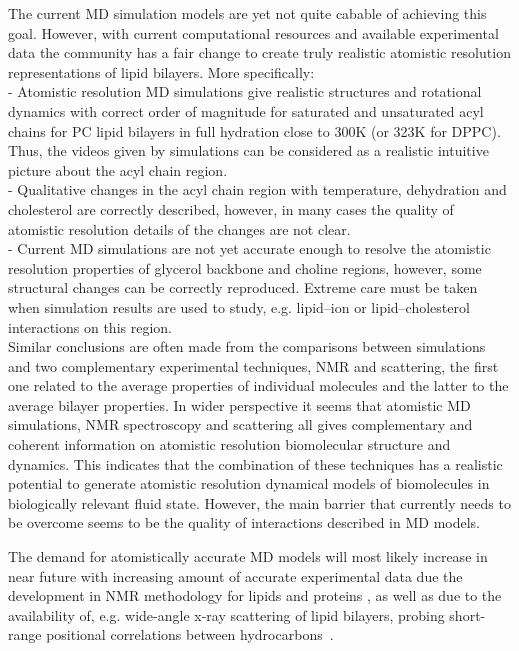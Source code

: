 \documentclass[aps,prl,superscriptaddress,twocolumn]{revtex4}
\begin{document}
The current MD simulation models are  yet not quite cabable of achieving this goal. 
However, with current computational resources and available experimental
data the community has a fair change to create truly realistic atomistic resolution 
representations of lipid bilayers. More specifically: \\
- Atomistic resolution MD simulations give realistic structures and rotational dynamics
with correct order of magnitude for saturated and unsaturated acyl chains for PC lipid 
bilayers in full hydration close to 300K (or 323K for DPPC). Thus, the videos given
by simulations can be considered as a realistic intuitive picture about the acyl chain region.\\
- Qualitative changes in the acyl chain region with temperature, dehydration and cholesterol are
correctly described, however, in many cases the quality of atomistic resolution details of the
changes are not clear. \\
- Current MD simulations are not yet accurate enough to resolve the atomistic resolution 
properties of glycerol backbone and choline regions, however, some structural changes can be 
correctly reproduced. Extreme care must be taken when simulation results are used to study, 
e.g. lipid--ion or lipid--cholesterol interactions on this region. \\

Similar conclusions are often made from the comparisons between simulations and two complementary 
experimental techniques, NMR and scattering, the first one related to the average properties
of individual molecules and the latter to the average bilayer properties. 
In wider perspective it seems that atomistic MD simulations, NMR spectroscopy and scattering all gives
complementary and coherent information on atomistic resolution biomolecular structure and dynamics. 
This indicates that the combination of these techniques has a realistic potential to generate atomistic 
resolution dynamical models of biomolecules in biologically relevant fluid state. However, the
main barrier that currently needs to be overcome seems to be the quality of interactions described in MD models.

The demand for atomistically accurate MD models will most likely increase in near future with increasing
amount of accurate experimental data due the development in NMR methodology  
for lipids \cite{ferreira13,leftin13,leftin14,ferreira15} and proteins \cite{hansen15}, 
as well as due to the availability of, e.g. wide-angle x-ray scattering of lipid bilayers, probing short-range positional 
correlations between hydrocarbons~\cite{spaar.2003}. 
\end{document}

